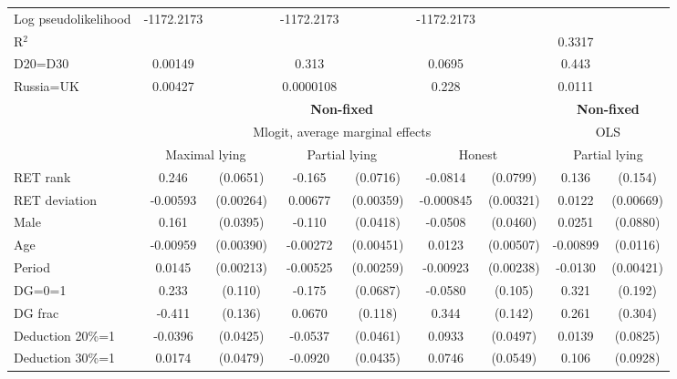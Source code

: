 \begin{tabular}{l|cccccc|cc}
Log pseudolikelihood  & -1172.2173   &         &  -1172.2173                &         &     -1172.2173             &         &           &   \\ 
R$^2$      &                  &         &                  &         &                  &         &       0.3317    &   \\ 
D20=D30         &  0.00149         &         &    0.313         &         &   0.0695         &         &    0.443         &         \\
Russia=UK       &  0.00427         &         &0.0000108         &         &    0.228         &         &   0.0111         &         \\
\hline\hline
&\multicolumn{6}{c|}{\bf Non-fixed}&\multicolumn{2}{c}{\bf Non-fixed}\\ &\multicolumn{6}{c|}{Mlogit, average marginal effects }&\multicolumn{2}{c}{OLS}\\
                &\multicolumn{2}{c}{Maximal lying}&\multicolumn{2}{c}{Partial lying}&\multicolumn{2}{c}{Honest}  &\multicolumn{2}{c}{Partial lying}\\
\hline
RET rank        &    0.246\sym{***}& (0.0651)&   -0.165\sym{**} & (0.0716)&  -0.0814         & (0.0799)&    0.136         &  (0.154)\\
RET deviation   & -0.00593\sym{**} &(0.00264)&  0.00677\sym{*}  &(0.00359)&-0.000845         &(0.00321)&   0.0122\sym{*}  &(0.00669)\\
Male            &    0.161\sym{***}& (0.0395)&   -0.110\sym{***}& (0.0418)&  -0.0508         & (0.0460)&   0.0251         & (0.0880)\\
Age             & -0.00959\sym{**} &(0.00390)& -0.00272         &(0.00451)&   0.0123\sym{**} &(0.00507)& -0.00899         & (0.0116)\\
Period          &   0.0145\sym{***}&(0.00213)& -0.00525\sym{**} &(0.00259)& -0.00923\sym{***}&(0.00238)&  -0.0130\sym{***}&(0.00421)\\
DG=0=1          &    0.233\sym{**} &  (0.110)&   -0.175\sym{**} & (0.0687)&  -0.0580         &  (0.105)&    0.321\sym{*}  &  (0.192)\\
DG frac         &   -0.411\sym{***}&  (0.136)&   0.0670         &  (0.118)&    0.344\sym{**} &  (0.142)&    0.261         &  (0.304)\\
Deduction 20\%=1&  -0.0396         & (0.0425)&  -0.0537         & (0.0461)&   0.0933\sym{*}  & (0.0497)&   0.0139         & (0.0825)\\
Deduction 30\%=1&   0.0174         & (0.0479)&  -0.0920\sym{**} & (0.0435)&   0.0746         & (0.0549)&    0.106         & (0.0928)\\

\end{tabular}
